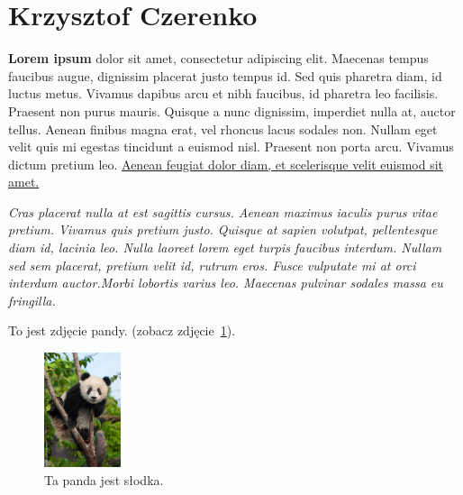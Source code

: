 \section{Krzysztof Czerenko}
\label{sec:krzyczer}

\begin {flushleft}
\textbf{Lorem ipsum} dolor sit amet, consectetur adipiscing elit. Maecenas tempus faucibus augue, dignissim placerat justo tempus id. Sed quis pharetra diam, id luctus metus. Vivamus dapibus arcu et nibh faucibus, id pharetra leo facilisis. Praesent non purus mauris. Quisque a nunc dignissim, imperdiet nulla at, auctor tellus. Aenean finibus magna erat, vel rhoncus lacus sodales non. Nullam eget velit quis mi egestas tincidunt a euismod nisl. Praesent non porta arcu. Vivamus dictum pretium leo. \underline{Aenean feugiat dolor diam, et scelerisque velit euismod sit amet.}\par
\end {flushleft}

\begin {center}
\textit{Cras placerat nulla at est sagittis cursus. Aenean maximus iaculis purus vitae pretium. Vivamus quis pretium justo. Quisque at sapien volutpat, pellentesque diam id, lacinia leo. Nulla laoreet lorem eget turpis faucibus interdum. Nullam sed sem placerat, pretium velit id, rutrum eros. Fusce vulputate mi at orci interdum auctor.Morbi lobortis varius leo. Maecenas pulvinar sodales massa eu fringilla.}\par
\end{center}

\vspace{2em}

To jest zdjęcie pandy. (zobacz zdjęcie~\ref{fig:panda}).

\vspace{2em}

\begin{figure}[htbp] 
    \centering
    \includegraphics[width=0.2\textwidth]{pictures/baby_panda.jpg} 
    \caption{Ta panda jest słodka.}
    \label{fig:panda}
\end{figure}

